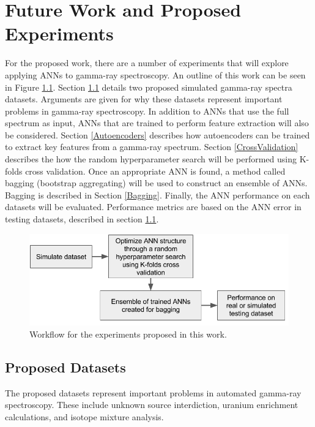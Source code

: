 \documentclass[tocnosub,noragright,centerchapter,12pt,fullpage]{uiucecethesis09}
\begin{document}
\chapter{Future Work and Proposed Experiments}

For the proposed work, there are a number of experiments that will explore applying ANNs to gamma-ray spectroscopy. An outline of this work can be seen in Figure \ref{fig:ANN_workflow}. Section \ref{ProposedDatasets} details two proposed simulated gamma-ray spectra datasets. Arguments are given for why these datasets represent important problems in gamma-ray spectroscopy. In addition to ANNs that use the full spectrum as input, ANNs that are trained to perform feature extraction will also be considered. Section \ref{Autoencoders} describes how autoencoders can be trained to extract key features from a gamma-ray spectrum. Section \ref{CrossValidation} describes the how the random hyperparameter search will be performed using K-folds cross validation. Once an appropriate ANN is found, a method called bagging (bootstrap aggregating) will be used to construct an ensemble of ANNs. Bagging is described in Section \ref{Bagging}. Finally, the ANN performance on each datasets will be evaluated. Performance metrics are based on the ANN error in testing datasets, described in section \ref{ProposedDatasets}.%




\begin{figure}[H]
\centering
\includegraphics[width=0.8\linewidth]{images/ANN_workflow}
\caption{Workflow for the experiments proposed in this work.}
\label{fig:ANN_workflow}
\end{figure}



\section{Proposed Datasets} \label{ProposedDatasets}

The proposed datasets represent important problems in automated gamma-ray spectroscopy. These include unknown source interdiction, uranium enrichment calculations, and isotope mixture analysis. 
\end{document}
